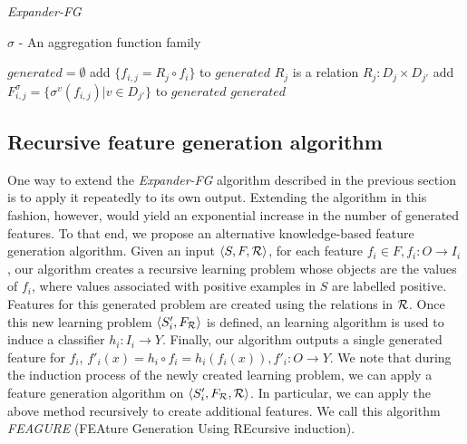 \documentclass[twoside,11pt]{article}
\theoremstyle{definition}
\begin{document}
\begin{algorithm}[H]
	\caption{\emph{Expander-FG}}
	\label{code-compete}
	\small
	$\sigma$ - An aggregation function family
	\begin{algorithmic}
		\State $generated=\emptyset$
		\State add $\{f_{i,j}=R_j\circ f_i\}$ to $generated$
		\Else \Comment $R_j$ is a relation $R_j:D_j\times D_{j'}$
		\State add $F^\sigma_{i,j}=\{\sigma^v(f_{i,j})|v\in D_{j'}\}$ to $generated$
		\EndIf
		\EndFor
		\EndFor
		\State \Return $generated$ 
		\EndFunction
		
	\end{algorithmic}
\end{algorithm}

\subsection{Recursive feature generation algorithm}
\label{algorithm_section}
One way to extend the \emph{Expander-FG} algorithm described in the previous section is to apply it repeatedly to its own output.
Extending the algorithm in this fashion, however, would yield an exponential increase in the number of generated features.
To that end, we propose an alternative knowledge-based feature generation algorithm. Given an input $\langle S,F,{\cal R} \rangle$, for each feature $f_i\in F, f_i:O\rightarrow I_i$, our algorithm creates a recursive learning problem whose objects are the values of $f_i$, where values associated with positive examples in $S$ are labelled positive. %
Features for this generated problem are created using the relations in ${\cal R}$. Once this new learning problem $\langle S'_i,F_{\cal R}\rangle$ is defined, an learning algorithm is used to induce a classifier $h_i:I_i\rightarrow Y$. Finally, our algorithm outputs a single generated feature for $f_i$, $f'_i(x)=h_i\circ f_i=h_i(f_i(x)), f'_i:O\rightarrow Y$.
We note that during the induction process of the newly created learning problem, we can apply a feature generation algorithm on $\langle S'_i,F_{\cal R},{\cal R} \rangle$. In particular, we can apply the above method recursively to create additional features. We call this algorithm \emph{FEAGURE} (FEAture Generation Using REcursive induction).
\end{document}
